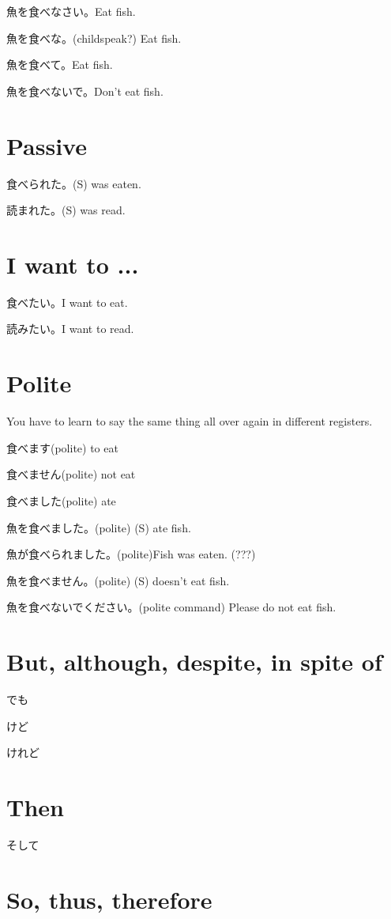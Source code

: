 魚を食べなさい。Eat fish.

魚を食べな。(childspeak?) Eat fish.

魚を食べて。Eat fish.

魚を食べないで。Don't eat fish.

\section{Passive}

食べられた。(S) was eaten.

読まれた。(S) was read.

\section{I want to ...}

食べたい。I want to eat.

読みたい。I want to read.

\section{Polite}

You have to learn to say the same thing all over again in different registers.

食べます(polite) to eat

食べません(polite) not eat

食べました(polite) ate

魚を食べました。(polite) (S) ate fish.

魚が食べられました。(polite)Fish was eaten. (???)

魚を食べません。(polite) (S) doesn't eat fish.

魚を食べないでください。(polite command) Please do not eat fish.

\section{But, although, despite, in spite of}

でも

けど

けれど

\section{Then}

そして

\section{So, thus, therefore}

